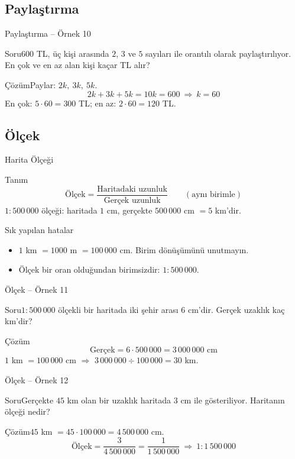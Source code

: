 \documentclass[aspectratio=169,11pt]{beamer}
\newcommand{\soru}[3]{%
\begin{frame}{#1}
  \begin{block}{Soru}\large #2\end{block}
  \pause
  \begin{exampleblock}{Çözüm}\large #3\end{exampleblock}
\end{frame}}
\begin{document}
\subsection{Paylaştırma}
\soru{Paylaştırma -- Örnek 10}
{\(600\) TL, üç kişi arasında \(2\), \(3\) ve \(5\) sayıları ile orantılı olarak paylaştırılıyor. En çok ve en az alan kişi kaçar TL alır?}
{Paylar: \(2k,\ 3k,\ 5k\).
\[2k+3k+5k=10k=600\ \Rightarrow\ k=60\]
En çok: \(5\cdot 60=300\) TL; \quad en az: \(2\cdot 60=120\) TL.}

\subsection{Ölçek}
\begin{frame}{Harita Ölçeği}
\begin{block}{Tanım}
\[\text{Ölçek}=\frac{\text{Haritadaki uzunluk}}{\text{Gerçek uzunluk}}\qquad(\text{aynı birimle})\]
\(1:500\,000\) ölçeği: haritada \(1\) cm, gerçekte \(500\,000\) cm \(=5\) km'dir.
\end{block}
\begin{alertblock}{Sık yapılan hatalar}
\begin{itemize}
\item \(1\) km \(=1000\) m \(=100\,000\) cm. Birim dönüşümünü unutmayın.
\item Ölçek bir oran olduğundan birimsizdir: \(1:500\,000\).
\end{itemize}
\end{alertblock}
\end{frame}

\soru{Ölçek -- Örnek 11}
{\(1:500\,000\) ölçekli bir haritada iki şehir arası \(6\) cm'dir. Gerçek uzaklık kaç km'dir?}
{\[\text{Gerçek}=6\cdot 500\,000=3\,000\,000\text{ cm}\]
\(1\) km \(=100\,000\) cm \(\Rightarrow\) \(3\,000\,000\div 100\,000=30\) km.}

\soru{Ölçek -- Örnek 12}
{Gerçekte \(45\) km olan bir uzaklık haritada \(3\) cm ile gösteriliyor. Haritanın ölçeği nedir?}
{\(45\) km \(=45\cdot 100\,000=4\,500\,000\) cm.
\[\text{Ölçek}=\frac{3}{4\,500\,000}=\frac{1}{1\,500\,000}\ \Rightarrow\ 1:1\,500\,000\]}
\end{document}
